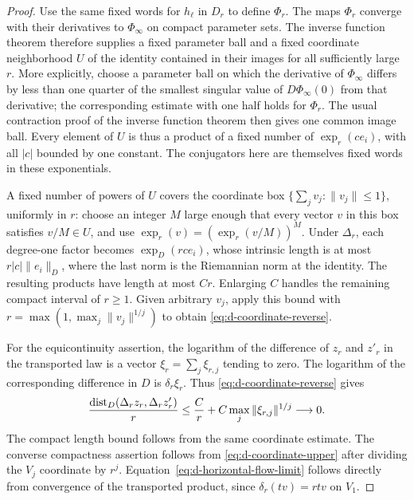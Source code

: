 \begin{proof}
Use the same fixed words for $h_\ell$ in $D_r$ to define
$\Phi_r$.  The maps $\Phi_r$ converge with their derivatives to
$\Phi_\infty$ on compact parameter sets.  The inverse function theorem
therefore supplies a fixed parameter ball and a fixed coordinate
neighborhood $U$ of the identity contained in their images for all
sufficiently large $r$.  More explicitly, choose a parameter ball on
which the derivative of $\Phi_\infty$ differs by less than one quarter of the
smallest singular value of $D\Phi_\infty(0)$ from that derivative;
the corresponding estimate with one half holds for $\Phi_r$.
The usual contraction proof of the inverse function theorem then gives
one common image ball.  Every element of $U$ is thus a product of a
fixed number of $\exp_r(c e_i)$, with all $|c|$ bounded by one constant.
The conjugators here are themselves fixed words in these exponentials.

A fixed number of powers of $U$ covers the coordinate box
$\{\sum_jv_j:\|v_j\|\le1\}$, uniformly in $r$:
choose an integer $M$ large enough that every vector $v$ in this box
satisfies $v/M\in U$, and use
$\exp_r(v)=(\exp_r(v/M))^M$.
Under $\Delta_r$, each degree-one factor becomes $\exp_D(rc e_i)$,
whose intrinsic length is at most $r|c|\|e_i\|_D$, where the last norm
is the Riemannian norm at the identity.  The resulting
products have length at most $Cr$.  Enlarging $C$ handles the remaining
compact interval of $r\ge1$.  Given arbitrary $v_j$, apply this bound
with $r=\max(1,\max_j\|v_j\|^{1/j})$ to obtain
\eqref{eq:d-coordinate-reverse}.

For the equicontinuity assertion, the logarithm of the difference of
$z_r$ and $z'_r$ in the transported law is a vector
$\xi_r=\sum_j\xi_{r,j}$ tending to zero.  The logarithm of the
corresponding difference in $D$ is $\delta_r\xi_r$.  Thus
\eqref{eq:d-coordinate-reverse} gives
\[
 \frac{\operatorname{dist}_D(\Delta_r z_r,\Delta_r z'_r)}r
   \le \frac Cr+C\max_j\|\xi_{r,j}\|^{1/j}\longrightarrow0.
\]
The compact length bound follows from the same coordinate estimate.
The converse compactness assertion follows from
\eqref{eq:d-coordinate-upper} after dividing the $V_j$ coordinate by
$r^j$.
Equation~\eqref{eq:d-horizontal-flow-limit} follows directly from
convergence of the transported product, since $\delta_r(tv)=rtv$ on
$V_1$.


\end{proof}
